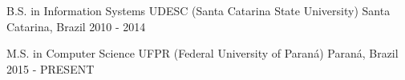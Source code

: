 

\begin{cventries}

  \cventry
    {B.S. in Information Systems} %
    {UDESC (Santa Catarina State University)} %
    {Santa Catarina, Brazil} %
    {2010 - 2014} %
    {
    }

  \cventry
	{M.S. in Computer Science} %
	{UFPR (Federal University of Paraná)} %
	{Paraná, Brazil} %
	{2015 - PRESENT} %
	{
	}
	

\end{cventries}

